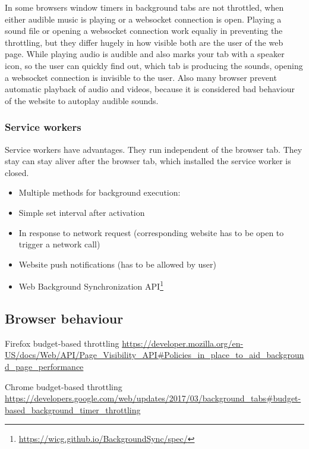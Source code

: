 \documentclass[article,type=bsc,colorback,accentcolor=tud9c]{tudthesis}
\begin{document}
  In some browsers window timers in background tabs are not throttled, when either audible music is playing or a websocket connection is open. Playing a sound file or opening a websocket connection work equaliy in preventing the throttling, but they differ hugely in how visible both are the user of the web page. While playing audio is audible and also marks your tab with a speaker icon, so the user can quickly find out, which tab is producing the sounds, opening a websocket connection is invisible to the user. Also many browser prevent automatic playback of audio and videos, because it is considered bad behaviour of the website to autoplay audible sounds.

  
  
  \subsubsection{Service workers}

  Service workers have advantages. They run independent of the browser tab. They stay can stay aliver after the browser tab, which installed the service worker is closed.

  \begin{itemize}   
  \item Multiple methods for background execution:

  \item Simple set interval after activation

  \item In response to network request (corresponding website has to be open to trigger a network call)

  \item Website push notifications (has to be allowed by user)

  \item Web Background Synchronization API\footnote{\url{https://wicg.github.io/BackgroundSync/spec/}}
  \end{itemize}

  
  \newpage

  \subsection{Browser behaviour}


  Firefox budget-based throttling
  \url{https://developer.mozilla.org/en-US/docs/Web/API/Page_Visibility_API#Policies_in_place_to_aid_background_page_performance}

  Chrome budget-based throttling
  \url{https://developers.google.com/web/updates/2017/03/background_tabs#budget-based_background_timer_throttling}
\end{document}
